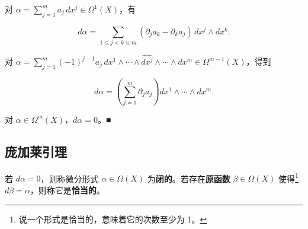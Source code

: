 \begin{example}

\begin{items}
\item

对 $ \alpha = \sum_{j=1}^{m} a_{j}\, dx^{j} \in \Omega^{1}(X) $，有

\[
d\alpha = \sum_{1 \le j < k \le m} (\partial_{j} a_{k} - \partial_{k} a_{j})\, dx^{j} \wedge dx^{k}.
\]
\item

对 $ \alpha = \sum_{j=1}^{m} (-1)^{j-1} a_{j}\, dx^{1} \wedge \cdots \wedge \widehat{dx^{j}} \wedge \cdots \wedge dx^{m} \in \Omega^{m-1}(X) $，得到

\[
d\alpha = \left( \sum_{j=1}^{m} \partial_{j} a_{j} \right) dx^{1} \wedge \cdots \wedge dx^{m}.
\]
\item

对 $ \alpha \in \Omega^{m}(X) $，$ d\alpha = 0 $。\nobreak\hspace{0.35em}■

\end{items}

\end{example}

\subsection*{庞加莱引理}

若 $ d\alpha = 0 $，则称微分形式 $ \alpha \in \Omega(X) $ 为\textbf{闭的}。若存在\textbf{原函数} $ \beta \in \Omega(X) $ 使得\footnote{说一个形式是恰当的，意味着它的次数至少为 1。} $ d\beta = \alpha $，则称它是\textbf{恰当的}。

